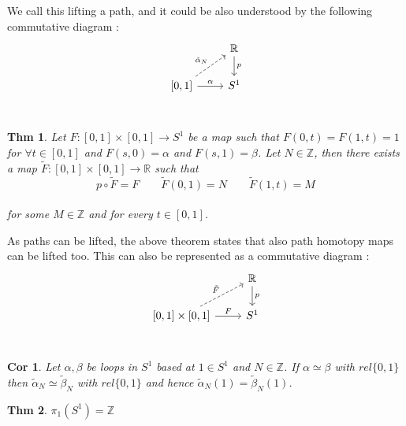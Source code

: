 \documentclass[paper=a4, fontsize=11pt]{scrartcl}
\newtheorem{theorem}{Thm}
\newtheorem{corollary}{Cor}
\begin{document}
We call this lifting a path, and it could be also understood by the following commutative diagram : \\


\[
\begin{tikzcd}	
& \mathbb{R} \arrow[d , "p"] \\
\left[0,1\right] \arrow[r , "\alpha"] \arrow[ru ,dashrightarrow, "\tilde{\alpha}_N"] & S^1 	
\end{tikzcd}	
\]
\\


\begin{theorem}
Let $F:[0,1]\times[0,1] \to S^1$ be a map such that $F(0,t)=F(1,t)=1$ for $\forall t \in [0,1]$ and $F(s,0)=\alpha$ and $F(s,1)=\beta$. Let $N \in \mathbb{Z}$, then there exists a map $\tilde{F}:[0,1]\times[0,1] \to \mathbb{R}$ such that \\

\begin{equation}\nonumber
	p \circ \tilde{F} = F \qquad \tilde{F}(0,1) = N \qquad \tilde{F}(1,t)=M 
\end{equation}\\

for some $M\in\mathbb{Z}$ and for every $t \in [0,1]$.\\
\end{theorem}

As paths can be lifted, the above theorem states that also path homotopy maps can be lifted too. This can also be represented as a commutative diagram : \\

\[
\begin{tikzcd}	
& \mathbb{R} \arrow[d , "p"] \\
\left[0,1\right]\times\left[0,1\right] \arrow[r , "F"] \arrow[ru ,dashrightarrow, "\tilde{F}"] & S^1 	
\end{tikzcd}	
\]
\\

\begin{corollary}
Let $\alpha,\beta$ be loops in $S^1$ based at $1\in S^1$ and $N \in \mathbb{Z}$. If $\alpha \simeq \beta$ with $rel \{0,1\}$ then $\tilde{\alpha}_N \simeq \tilde{\beta}_N$ with $rel \{0,1\}$ and hence $\tilde{\alpha}_N(1)=\tilde{\beta}_N(1)$.\\
\end{corollary}

\begin{theorem}
	$\pi_1(S^1) = \mathbb{Z}$\\
\end{theorem}
\end{document}
